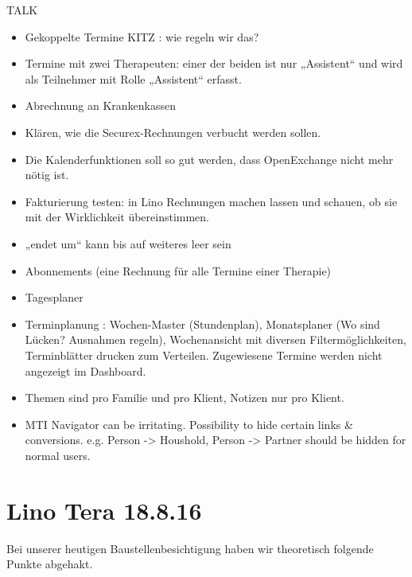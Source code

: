 \documentclass[letterpaper,10pt,ngerman]{sphinxmanual}
\begin{document}
TALK
\begin{itemize}
\item {} 
Gekoppelte Termine KITZ : wie regeln wir das?

\item {} 
Termine mit zwei Therapeuten: einer der beiden ist nur „Assistent“
und wird als Teilnehmer mit Rolle „Assistent“ erfasst.

\item {} 
Abrechnung an Krankenkassen

\item {} 
Klären, wie die Securex-Rechnungen verbucht werden sollen.

\item {} 
Die Kalenderfunktionen soll so gut werden, dass OpenExchange nicht
mehr nötig ist.

\item {} 
Fakturierung testen: in Lino Rechnungen machen lassen und schauen,
ob sie mit der Wirklichkeit übereinstimmen.

\item {} 
„endet um“ kann bis auf weiteres leer sein

\item {} 
Abonnements (eine Rechnung für alle Termine einer Therapie)

\item {} 
Tagesplaner

\item {} 
Terminplanung : Wochen-Master (Stundenplan), Monatsplaner (Wo sind
Lücken? Ausnahmen regeln), Wochenansicht mit diversen
Filtermöglichkeiten, Terminblätter drucken zum
Verteilen. Zugewiesene Termine werden nicht angezeigt im Dashboard.

\item {} 
Themen sind pro Familie und pro Klient, Notizen nur pro Klient.

\item {} 
MTI Navigator can be irritating. Possibility to hide certain links \&
conversions. e.g. Person -\textgreater{} Houshold, Person -\textgreater{} Partner should be
hidden for normal users.

\end{itemize}


\section{Lino Tera 18.8.16}
\label{\detokenize{changes/20180816:lino-tera-18-8-16}}\label{\detokenize{changes/20180816:tera-18-8-16}}\label{\detokenize{changes/20180816::doc}}
Bei unserer heutigen Baustellenbesichtigung haben wir theoretisch
folgende Punkte abgehakt.
\end{document}
